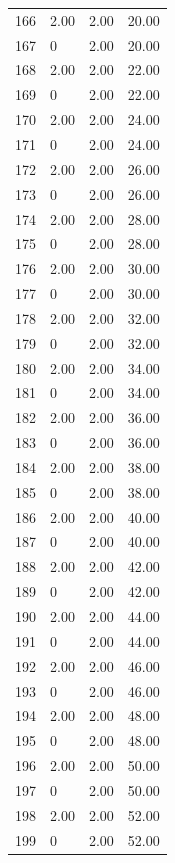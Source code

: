 \documentclass[a4paper,11pt]{article}
\begin{document}
\begin{center}
\begin{longtable}{|R{1.5cm}|R{2.4cm}|R{2.4cm}|R{2.4cm}|}
  166 &   2.00  &   2.00  &  20.00 \\ 
  167 & 0  &   2.00  &  20.00 \\ 
  168 &   2.00  &   2.00  &  22.00 \\ 
  169 & 0  &   2.00  &  22.00 \\ 
  170 &   2.00  &   2.00  &  24.00 \\ 
  171 & 0  &   2.00  &  24.00 \\ 
  172 &   2.00  &   2.00  &  26.00 \\ 
  173 & 0  &   2.00  &  26.00 \\ 
  174 &   2.00  &   2.00  &  28.00 \\ 
  175 & 0  &   2.00  &  28.00 \\ 
  176 &   2.00  &   2.00  &  30.00 \\ 
  177 & 0  &   2.00  &  30.00 \\ 
  178 &   2.00  &   2.00  &  32.00 \\ 
  179 & 0  &   2.00  &  32.00 \\ 
  180 &   2.00  &   2.00  &  34.00 \\ 
  181 & 0  &   2.00  &  34.00 \\ 
  182 &   2.00  &   2.00  &  36.00 \\ 
  183 & 0  &   2.00  &  36.00 \\ 
  184 &   2.00  &   2.00  &  38.00 \\ 
  185 & 0  &   2.00  &  38.00 \\ 
  186 &   2.00  &   2.00  &  40.00 \\ 
  187 & 0  &   2.00  &  40.00 \\ 
  188 &   2.00  &   2.00  &  42.00 \\ 
  189 & 0  &   2.00  &  42.00 \\ 
  190 &   2.00  &   2.00  &  44.00 \\ 
  191 & 0  &   2.00  &  44.00 \\ 
  192 &   2.00  &   2.00  &  46.00 \\ 
  193 & 0  &   2.00  &  46.00 \\ 
  194 &   2.00  &   2.00  &  48.00 \\ 
  195 & 0  &   2.00  &  48.00 \\ 
  196 &   2.00  &   2.00  &  50.00 \\ 
  197 & 0  &   2.00  &  50.00 \\ 
  198 &   2.00  &   2.00  &  52.00 \\ 
  199 & 0  &   2.00  &  52.00 \\ 

\end{longtable}
\end{center}
\end{document}
